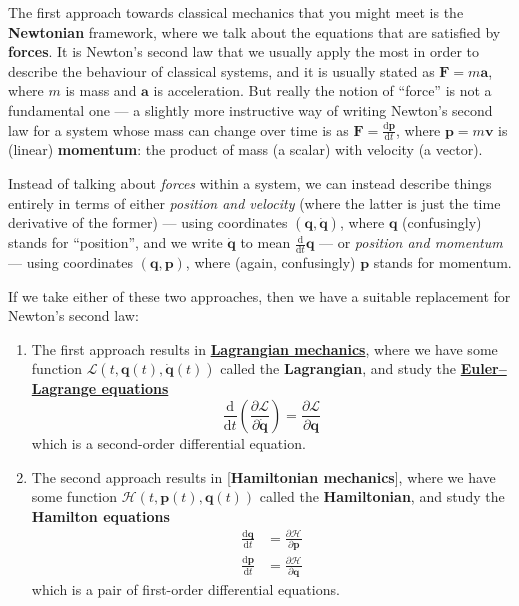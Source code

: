 \documentclass[fleqn]{article}
\providecommand{\tightlist}{%
  \setlength{\itemsep}{0pt}\setlength{\parskip}{0pt}}
\newenvironment{technical}{\noindent}{\medskip}
\begin{document}
\begin{technical}
The first approach towards classical mechanics that you might meet is the \textbf{Newtonian} framework, where we talk about the equations that are satisfied by \textbf{forces}.
It is Newton's second law that we usually apply the most in order to describe the behaviour of classical systems, and it is usually stated as \(\mathbf{F}=m\mathbf{a}\), where \(m\) is mass and \(\mathbf{a}\) is acceleration.
But really the notion of ``force'' is not a fundamental one --- a slightly more instructive way of writing Newton's second law for a system whose mass can change over time is as \(\mathbf{F}=\frac{\mathrm{d}\mathbf{p}}{\mathrm{d}t}\), where \(\mathbf{p}=m\mathbf{v}\) is (linear) \textbf{momentum}: the product of mass (a scalar) with velocity (a vector).

Instead of talking about \emph{forces} within a system, we can instead describe things entirely in terms of either \emph{position and velocity} (where the latter is just the time derivative of the former) --- using coordinates \((\mathbf{q},\dot{\mathbf{q}})\), where \(\mathbf{q}\) (confusingly) stands for ``position'', and we write \(\dot{\mathbf{q}}\) to mean \(\frac{\mathrm{d}}{\mathrm{d}t}\mathbf{q}\) --- or \emph{position and momentum} --- using coordinates \((\mathbf{q},\mathbf{p})\), where (again, confusingly) \(\mathbf{p}\) stands for momentum.

If we take either of these two approaches, then we have a suitable replacement for Newton's second law:

\begin{enumerate}
\def\labelenumi{\arabic{enumi}.}
\tightlist
\item
  The first approach results in \href{https://en.wikipedia.org/wiki/Lagrangian_mechanics}{\textbf{Lagrangian mechanics}}, where we have some function \(\mathcal{L}(t,\mathbf{q}(t),\dot{\mathbf{q}}(t))\) called the \textbf{Lagrangian}, and study the \href{https://en.wikipedia.org/wiki/Euler\%E2\%80\%93Lagrange_equation}{\textbf{Euler--Lagrange equations}}
  \[
     \frac{\mathrm{d}}{\mathrm{d}t}\left(\frac{\partial\mathcal{L}}{\partial \dot{\mathbf{q}}}\right)
     = \frac{\partial\mathcal{L}}{\partial\mathbf{q}}
   \]
  which is a second-order differential equation.
\item
  The second approach results in {[}\textbf{Hamiltonian mechanics}{]}, where we have some function \(\mathcal{H}(t,\mathbf{p}(t),\mathbf{q}(t))\) called the \textbf{Hamiltonian}, and study the \textbf{Hamilton equations}
  \[
     \begin{aligned}
       \frac{\mathrm{d}\mathbf{q}}{\mathrm{d}t}
       &= \frac{\partial\mathcal{H}}{\partial\mathbf{p}}
     \\\frac{\mathrm{d}\mathbf{p}}{\mathrm{d}t}
       &= \frac{\partial\mathcal{H}}{\partial\mathbf{q}}
     \end{aligned}
   \]
  which is a pair of first-order differential equations.
\end{enumerate}


\end{technical}
\end{document}
